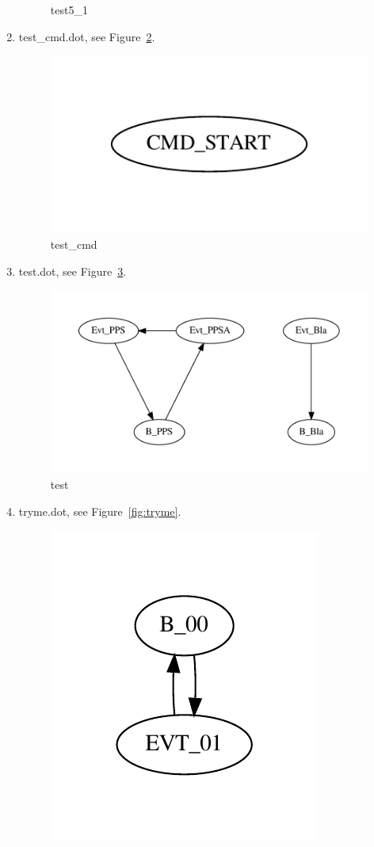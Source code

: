 \documentclass[12pt,a4paper]{report}
\begin{document}
\begin{enumerate}
\begin{figure}
        \caption{test5\_1}
        \label{fig:test5_1}
    \end{figure}
\item test\_cmd.dot, see Figure~\ref{fig:test_cmd}.
    \begin{figure}
        \centering
        \includegraphics{TestPattern/test_cmd.pdf}
        \caption{test\_cmd}
        \label{fig:test_cmd}
    \end{figure}
\item test.dot, see Figure~\ref{fig:test}.
    \begin{figure}
        \centering
        \includegraphics*[width=1.0\textwidth,keepaspectratio]{TestPattern/test.pdf}
        \caption{test}
        \label{fig:test}
    \end{figure}
\item tryme.dot, see Figure~\ref{fig:tryme}.
    \begin{figure}
        \centering
        \includegraphics{TestPattern/tryme.pdf}

\end{figure}
\end{enumerate}
\end{document}
